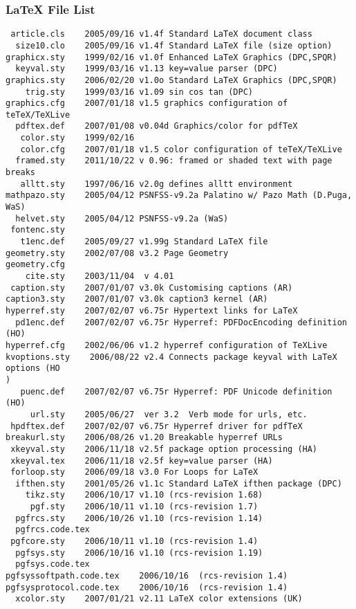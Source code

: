 \subsubsection{\LaTeX{} File List}
\begin{lstlisting} 
 article.cls    2005/09/16 v1.4f Standard LaTeX document class
  size10.clo    2005/09/16 v1.4f Standard LaTeX file (size option)
graphicx.sty    1999/02/16 v1.0f Enhanced LaTeX Graphics (DPC,SPQR)
  keyval.sty    1999/03/16 v1.13 key=value parser (DPC)
graphics.sty    2006/02/20 v1.0o Standard LaTeX Graphics (DPC,SPQR)
    trig.sty    1999/03/16 v1.09 sin cos tan (DPC)
graphics.cfg    2007/01/18 v1.5 graphics configuration of teTeX/TeXLive
  pdftex.def    2007/01/08 v0.04d Graphics/color for pdfTeX
   color.sty    1999/02/16
   color.cfg    2007/01/18 v1.5 color configuration of teTeX/TeXLive
  framed.sty    2011/10/22 v 0.96: framed or shaded text with page breaks
   alltt.sty    1997/06/16 v2.0g defines alltt environment
mathpazo.sty    2005/04/12 PSNFSS-v9.2a Palatino w/ Pazo Math (D.Puga, WaS) 
  helvet.sty    2005/04/12 PSNFSS-v9.2a (WaS) 
 fontenc.sty
   t1enc.def    2005/09/27 v1.99g Standard LaTeX file
geometry.sty    2002/07/08 v3.2 Page Geometry
geometry.cfg
    cite.sty    2003/11/04  v 4.01
 caption.sty    2007/01/07 v3.0k Customising captions (AR)
caption3.sty    2007/01/07 v3.0k caption3 kernel (AR)
hyperref.sty    2007/02/07 v6.75r Hypertext links for LaTeX
  pd1enc.def    2007/02/07 v6.75r Hyperref: PDFDocEncoding definition (HO)
hyperref.cfg    2002/06/06 v1.2 hyperref configuration of TeXLive
kvoptions.sty    2006/08/22 v2.4 Connects package keyval with LaTeX options (HO
)
   puenc.def    2007/02/07 v6.75r Hyperref: PDF Unicode definition (HO)
     url.sty    2005/06/27  ver 3.2  Verb mode for urls, etc.
 hpdftex.def    2007/02/07 v6.75r Hyperref driver for pdfTeX
breakurl.sty    2006/08/26 v1.20 Breakable hyperref URLs
 xkeyval.sty    2006/11/18 v2.5f package option processing (HA)
 xkeyval.tex    2006/11/18 v2.5f key=value parser (HA)
 forloop.sty    2006/09/18 v3.0 For Loops for LaTeX
  ifthen.sty    2001/05/26 v1.1c Standard LaTeX ifthen package (DPC)
    tikz.sty    2006/10/17 v1.10 (rcs-revision 1.68)
     pgf.sty    2006/10/11 v1.10 (rcs-revision 1.7)
  pgfrcs.sty    2006/10/26 v1.10 (rcs-revision 1.14)
  pgfrcs.code.tex
 pgfcore.sty    2006/10/11 v1.10 (rcs-revision 1.4)
  pgfsys.sty    2006/10/16 v1.10 (rcs-revision 1.19)
  pgfsys.code.tex
pgfsyssoftpath.code.tex    2006/10/16  (rcs-revision 1.4)
pgfsysprotocol.code.tex    2006/10/16  (rcs-revision 1.4)
  xcolor.sty    2007/01/21 v2.11 LaTeX color extensions (UK)

\end{lstlisting}
